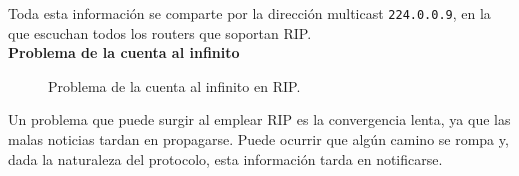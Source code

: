 Toda esta información se comparte por la dirección multicast \verb|224.0.0.9|, en la que escuchan todos los routers que soportan \acrshort{RIP}.\\

\noindent\textbf{Problema de la cuenta al infinito}
\begin{figure}
    \centering
    \caption{Problema de la cuenta al infinito en \acrshort{RIP}.}
    \label{fig:rip}
\end{figure}

Un problema que puede surgir al emplear \acrshort{RIP} es la convergencia lenta, ya que las malas noticias tardan en propagarse. Puede ocurrir que algún camino se rompa y, dada la naturaleza del protocolo, esta información tarda en notificarse.

